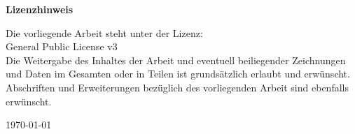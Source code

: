 
\begin{titlepage}
\begin{center}
\huge{\textbf{Lizenzhinweis}}
\end{center}
\vspace{4.5cm}

Die vorliegende Arbeit steht unter der Lizenz:
\vspace*{1cm}\\General Public License v3\vspace*{1cm}\\
Die Weitergabe des Inhaltes der Arbeit und eventuell beiliegender Zeichnungen und Daten im Gesamten oder in Teilen ist grundsätzlich erlaubt und erwünscht. Abschriften und Erweiterungen bezüglich des vorliegenden Arbeit sind ebenfalls erwünscht.

\begin{flushleft}
\vspace{\fill}
\today 
\end{flushleft}
\end{titlepage}